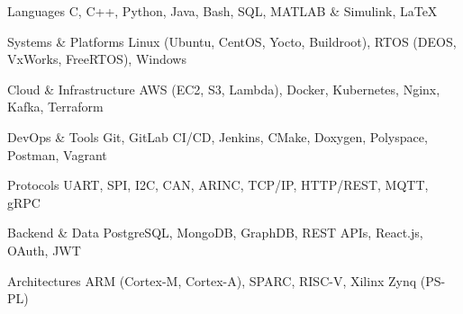 
\begin{cvskills}
  \cvskill
    {Languages}
    {C, C++, Python, Java, Bash, SQL, MATLAB \& Simulink, LaTeX}

  \cvskill
    {Systems \& Platforms}
    {Linux (Ubuntu, CentOS, Yocto, Buildroot), RTOS (DEOS, VxWorks, FreeRTOS), Windows}

  \cvskill
    {Cloud \& Infrastructure}
    {AWS (EC2, S3, Lambda), Docker, Kubernetes, Nginx, Kafka, Terraform}

  \cvskill
    {DevOps \& Tools}
    {Git, GitLab CI/CD, Jenkins, CMake, Doxygen, Polyspace, Postman, Vagrant}

  \cvskill
    {Protocols}
    {UART, SPI, I2C, CAN, ARINC, TCP/IP, HTTP/REST, MQTT, gRPC}

  \cvskill
    {Backend \& Data}
    {PostgreSQL, MongoDB, GraphDB, REST APIs, React.js, OAuth, JWT}

  \cvskill
    {Architectures}
    {ARM (Cortex-M, Cortex-A), SPARC, RISC-V, Xilinx Zynq (PS-PL)}
\end{cvskills}
